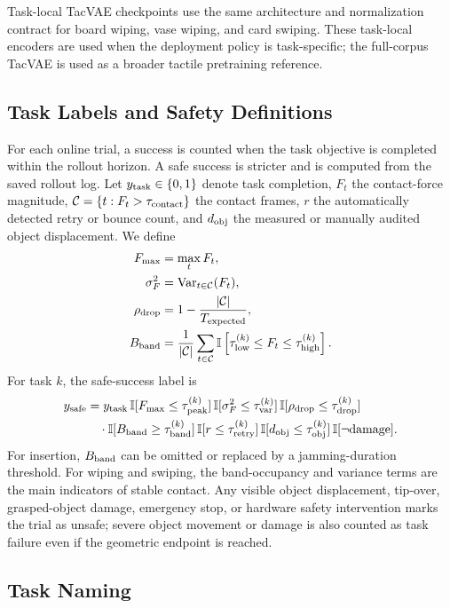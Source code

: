 \documentclass[10pt,letterpaper]{article}
\begin{document}
Task-local TacVAE checkpoints use the same architecture and normalization
contract for board wiping, vase wiping, and card swiping. These task-local
encoders are used when the deployment policy is task-specific; the full-corpus
TacVAE is used as a broader tactile pretraining reference.

\subsection{Task Labels and Safety Definitions}

For each online trial, a success is counted when the task objective is completed
within the rollout horizon. A safe success is stricter and is computed from the
saved rollout log. Let $y_{\rm task}\in\{0,1\}$ denote task completion, $F_t$ the
contact-force magnitude, $\mathcal{C}=\{t:F_t>\tau_{\rm contact}\}$ the contact
frames, $r$ the automatically detected retry or bounce count, and $d_{\rm obj}$
the measured or manually audited object displacement. We define
\begin{align}
F_{\max} &= \max_t F_t,\\
\sigma_F^2 &= {\rm Var}_{t\in\mathcal{C}}(F_t),\\
\rho_{\rm drop} &= 1-\frac{|\mathcal{C}|}{T_{\rm expected}},\\
B_{\rm band} &=
\frac{1}{|\mathcal{C}|}
\sum_{t\in\mathcal{C}}
\mathbb{I}\left[\tau_{\rm low}^{(k)} \le F_t \le \tau_{\rm high}^{(k)}\right].
\end{align}
For task $k$, the safe-success label is
\begin{align}
y_{\rm safe}
&= y_{\rm task}\,
\mathbb{I}[F_{\max}\le\tau_{\rm peak}^{(k)}]\,
\mathbb{I}[\sigma_F^2\le\tau_{\rm var}^{(k)}]\,
\mathbb{I}[\rho_{\rm drop}\le\tau_{\rm drop}^{(k)}]\nonumber\\
&\quad\cdot
\mathbb{I}[B_{\rm band}\ge\tau_{\rm band}^{(k)}]\,
\mathbb{I}[r\le\tau_{\rm retry}^{(k)}]\,
\mathbb{I}[d_{\rm obj}\le\tau_{\rm obj}^{(k)}]\,
\mathbb{I}[\neg{\rm damage}].
\end{align}
For insertion, $B_{\rm band}$ can be omitted or replaced by a jamming-duration
threshold. For wiping and swiping, the band-occupancy and variance terms are the
main indicators of stable contact. Any visible object displacement, tip-over,
grasped-object damage, emergency stop, or hardware safety intervention marks the
trial as unsafe; severe object movement or damage is also counted as task
failure even if the geometric endpoint is reached.

\subsection{Task Naming}
\end{document}
